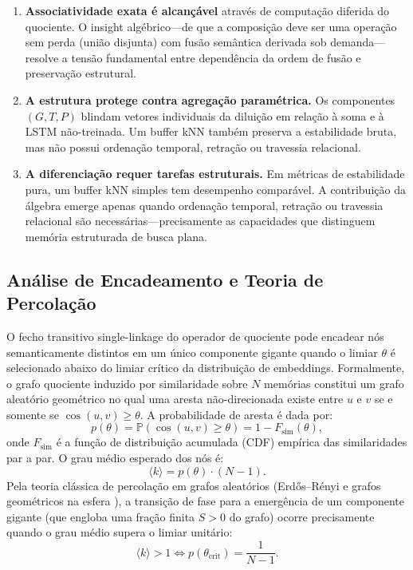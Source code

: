 \documentclass[11pt,a4paper]{article}
\theoremstyle{definition}
\begin{document}
\begin{enumerate}
    \item \textbf{Associatividade exata \'e alcan\c{c}\'avel} atrav\'es de computa\c{c}\~ao diferida do quociente. O insight alg\'ebrico---de que a composi\c{c}\~ao deve ser uma opera\c{c}\~ao sem perda (uni\~ao disjunta) com fus\~ao sem\^antica derivada sob demanda---resolve a tens\~ao fundamental entre depend\^encia da ordem de fus\~ao e preserva\c{c}\~ao estrutural.
    
    \item \textbf{A estrutura protege contra agrega\c{c}\~ao param\'etrica.} Os componentes $(G, T, P)$ blindam vetores individuais da dilui\c{c}\~ao em rela\c{c}\~ao \`a soma e \`a LSTM n\~ao-treinada. Um buffer kNN tamb\'em preserva a estabilidade bruta, mas n\~ao possui ordena\c{c}\~ao temporal, retra\c{c}\~ao ou travessia relacional.
    
    \item \textbf{A diferencia\c{c}\~ao requer tarefas estruturais.} Em m\'etricas de estabilidade pura, um buffer kNN simples tem desempenho compar\'avel. A contribui\c{c}\~ao da \'algebra emerge apenas quando ordena\c{c}\~ao temporal, retra\c{c}\~ao ou travessia relacional s\~ao necess\'arias---precisamente as capacidades que distinguem mem\'oria estruturada de busca plana.
\end{enumerate}

\subsection{An\'alise de Encadeamento e Teoria de Percola\c{c}\~ao}\label{sec:chaining}

O fecho transitivo single-linkage do operador de quociente pode encadear n\'os semanticamente distintos em um \'unico componente gigante quando o limiar $\theta$ \'e selecionado abaixo do limiar cr\'itico da distribui\c{c}\~ao de embeddings. Formalmente, o grafo quociente induzido por similaridade sobre $N$ mem\'orias constitui um grafo aleat\'orio geom\'etrico no qual uma aresta n\~ao-direcionada existe entre $u$ e $v$ se e somente se $\cos(u, v) \ge \theta$. A probabilidade de aresta \'e dada por:
\[
p(\theta) = \mathbb{P}(\cos(u, v) \ge \theta) = 1 - F_{\mathrm{sim}}(\theta),
\]
onde $F_{\mathrm{sim}}$ \'e a fun\c{c}\~ao de distribui\c{c}\~ao acumulada (CDF) emp\'irica das similaridades par a par. O grau m\'edio esperado dos n\'os \'e:
\[
\langle k \rangle = p(\theta) \cdot (N - 1).
\]
Pela teoria cl\'assica de percola\c{c}\~ao em grafos aleat\'orios (Erd\H{o}s--R\'enyi e grafos geom\'etricos na esfera \cite{penrose2003random}), a transi\c{c}\~ao de fase para a emerg\^encia de um componente gigante (que engloba uma fra\c{c}\~ao finita $S > 0$ do grafo) ocorre precisamente quando o grau m\'edio supera o limiar unit\'ario:
\[
\langle k \rangle > 1 \iff p(\theta_{\mathrm{crit}}) = \frac{1}{N - 1}.
\]
\end{document}
